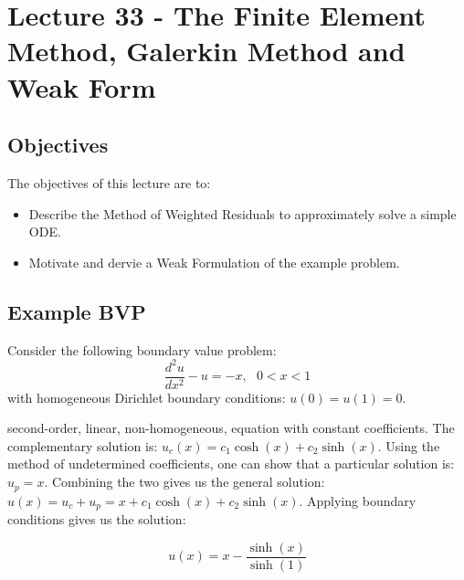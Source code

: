 \chapter{Lecture 33 - The Finite Element Method, Galerkin Method and Weak Form}
\label{ch:lec33n}
\section{Objectives}
The objectives of this lecture are to:
\begin{itemize}
\item Describe the Method of Weighted Residuals to approximately solve a simple ODE.
\item Motivate and dervie a Weak Formulation of the example problem.
\end{itemize}
\setcounter{lstannotation}{0}

\section{Example BVP}
Consider the following boundary value problem:
\begin{equation*}
\frac{d^2u}{dx^2}-u = -x, \ \ \ 0 < x < 1 
\end{equation*}
with homogeneous Dirichlet boundary conditions: $u(0)=u(1) = 0$.

 second-order, linear, non-homogeneous, equation with constant coefficients.  The complementary solution is: $u_c(x) = c_1\cosh{(x)}+c_2\sinh{(x)}$.  Using the method of undetermined coefficients, one can show that a particular solution is: $u_p = x$.  Combining the two gives us the general solution: $u(x) = u_c + u_p = x + c_1\cosh{(x)}+c_2\sinh{(x)}$. Applying boundary conditions gives us the solution:

\begin{equation}
u(x) = x - \frac{\sinh{(x)}}{\sinh{(1)}}
\label{eq:lec33n-ex-analytic}
\end{equation}
